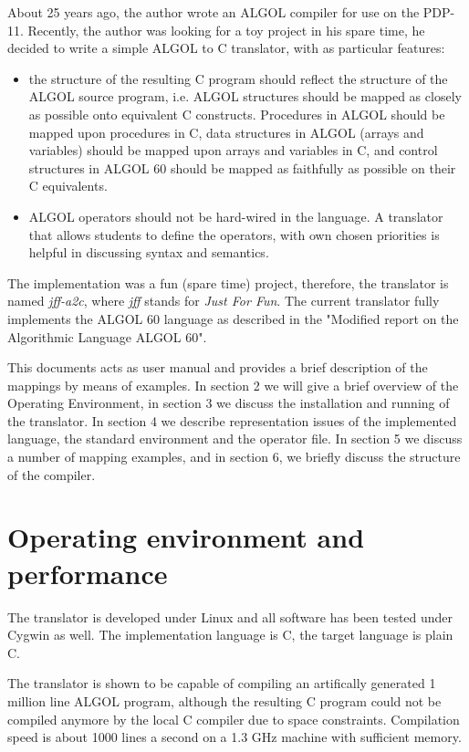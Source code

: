 \documentclass[11pt]{article}
\begin{document}
About 25 years ago, the author wrote an ALGOL compiler for
use on the PDP-11. Recently, the author was looking for a toy
project in his spare time, he decided to write a
simple ALGOL to C translator, with as particular features:
\begin{itemize}
\item
the structure of the resulting C program should reflect the structure of the
ALGOL source program, i.e.  ALGOL structures should be mapped as closely as
possible onto equivalent C constructs. Procedures in ALGOL should be mapped
upon procedures in C, data structures in ALGOL (arrays and variables)
should be mapped upon arrays and variables in C, and control structures in
ALGOL 60 should be mapped as faithfully as possible on
their C equivalents.
\item
ALGOL operators should not be hard-wired in the language.
A translator that allows students to define the operators, with own chosen
priorities is helpful in discussing syntax and semantics.
\end{itemize}

The implementation was a fun (spare time) project, therefore,
the translator is named {\em jff-a2c}, where {\em jff} stands for
{\em Just For Fun}.
The current translator fully implements the ALGOL 60
language as described in the "Modified report on the Algorithmic Language
ALGOL 60".

This documents acts as user manual and provides 
a brief description of the mappings by means of examples.
In section 2 we will give a brief overview of the Operating Environment,
in section 3 we discuss the installation and running of the translator.
In section 4 we describe representation issues of the implemented language,
the standard environment and the operator file.
In section 5 we discuss a number of mapping examples,
and in section 6, we briefly discuss the structure of the compiler.
\section{Operating environment and performance}

The translator is developed under Linux and all software has
been tested under Cygwin as well. The implementation language is C,
the target language is plain C.

The translator is shown to be capable of compiling an artifically generated
1 million line  ALGOL program, although the resulting C program could not be compiled anymore
by the local C compiler due to space constraints.
Compilation speed is about 1000 lines a second on a 1.3 GHz machine with sufficient memory.
\end{document}
